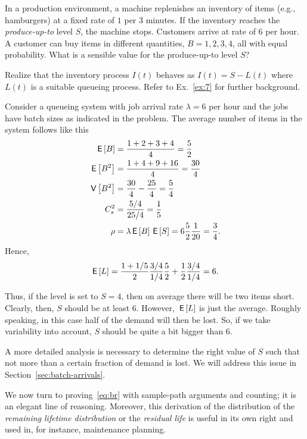 \begin{exercise}
  In a production environment, a machine replenishes an inventory of
  items (e.g., hamburgers) at a fixed rate of $1$ per 3 minutes. If
  the inventory reaches the \emph{produce-up-to} level $S$, the machine stops.  Customers
  arrive at rate of 6 per hour. A customer can buy items in different
  quantities, $B=1,2,3,4$, all with equal probability. What is a
  sensible value for the produce-up-to level $S$?   
  \begin{hint}
Realize that the inventory process $I(t)$ behaves as     $I(t)=S-L(t)$ where $L(t)$ is a suitable queueing process. Refer to Ex.~\ref{ex:7} for further background.
  \end{hint}
  \begin{solution}
Consider a queueing system with job
arrival rate $\lambda=6$ per hour and the jobs have batch sizes as
indicated in the problem. The average number of items in the system
follows like this
    \begin{align*}
      \,\mathsf{E}\left[B\right] &= \frac{1+2+3+4}{4} = \frac 52 \\
      \,\mathsf{E}\left[B^2\right] &= \frac{1+4+9+16}{4} = \frac{30}4\\
      \,\mathsf{V}\left[B^2\right] &= \frac{30}4 - \frac{25}4 = \frac 5 4\\
      C_s^2 &= \frac{5/4}{25/4} = \frac 15\\
      \rho &= \lambda \,\mathsf{E}\left[B\right] \,\mathsf{E}\left[S\right] = 6 \frac 52 \frac 1{20} = \frac 34.
    \end{align*}
Hence, 
\begin{equation*}
  \,\mathsf{E}\left[L\right] = \frac {1+1/5}2 \frac{3/4}{1/4} \frac 52 + \frac 12 \frac{3/4}{1/4} = 6.
\end{equation*}

Thus, if the level is set to $S=4$, then on average there will be two
items short. Clearly, then, $S$ should be at least $6$. However,
$\,\mathsf{E}\left[L\right]$ is just the average. Roughly speaking, in this case half of
the demand will then be lost. So, if we take variability into account,
$S$ should be quite a bit bigger than 6. 

A more detailed analysis is
necessary to determine the right value of $S$ such that not more than
a certain fraction of demand is lost. We will address this issue in
Section~\ref{sec:batch-arrivals}.
  \end{solution}
\end{exercise}



We now turn to proving~\eqref{eq:br} with sample-path arguments and
counting; it is an elegant line of reasoning. Moreover, this derivation of the distribution of  the \emph{remaining lifetime   distribution} or the \emph{residual life} is useful in its own right and used in, for instance, maintenance planning. 


